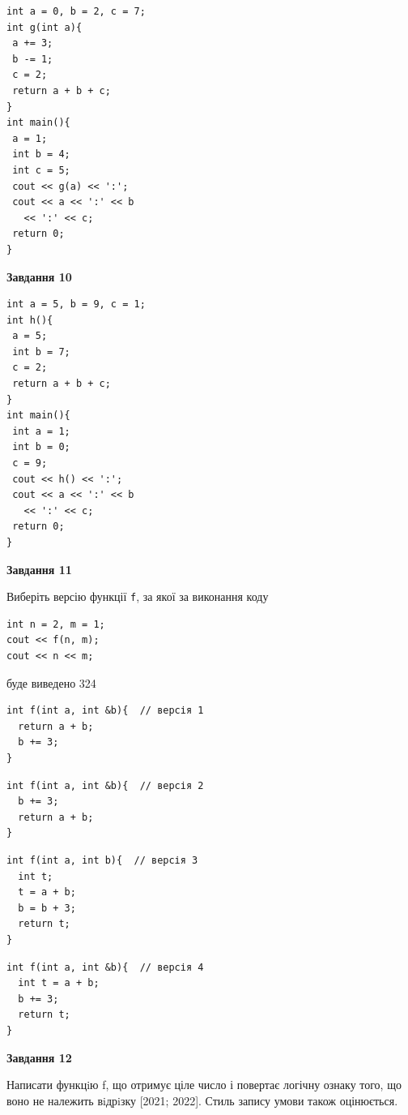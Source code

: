 \documentclass[12pt, ukrainian]{article}
\def\code#1{\Verb!#1!}
\begin{document}
{\begin {large}
\begin{minipage}[t]{7.0cm}
\begin{verbatim}
int a = 0, b = 2, c = 7;
int g(int a){
 a += 3;
 b -= 1;
 c = 2;
 return a + b + c;
}
int main(){
 a = 1;
 int b = 4;
 int c = 5;
 cout << g(a) << ':';
 cout << a << ':' << b 
   << ':' << c;
 return 0;
}
\end{verbatim}



\begin{center}
\textbf{Завдання 10}
\end{center}
\vspace{-8mm}

\begin{verbatim}
int a = 5, b = 9, c = 1;
int h(){
 a = 5;
 int b = 7;
 c = 2;
 return a + b + c;
}
int main(){
 int a = 1;
 int b = 0;
 c = 9;
 cout << h() << ':';
 cout << a << ':' << b 
   << ':' << c;
 return 0;
}
\end{verbatim}

\end{minipage}
\vline \hspace{1mm}
\begin{minipage}[t]{11.0cm}

\begin{center}
\textbf{Завдання 11}
\end{center}
Виберіть версію функції \code{f}, за якої за виконання коду
\begin{verbatim}
int n = 2, m = 1;
cout << f(n, m);
cout << n << m;
\end{verbatim}

буде виведено 324

\begin{verbatim}
int f(int a, int &b){  // версія 1
  return a + b;
  b += 3;
}
\end{verbatim}

\vspace{-8mm}\begin{verbatim}
int f(int a, int &b){  // версія 2
  b += 3;
  return a + b;
}
\end{verbatim}

\vspace{-8mm}\begin{verbatim}
int f(int a, int b){  // версія 3
  int t;
  t = a + b;
  b = b + 3;
  return t;
}
\end{verbatim}

\vspace{-8mm}\begin{verbatim}
int f(int a, int &b){  // версія 4
  int t = a + b;
  b += 3;
  return t;
}
\end{verbatim}



\begin{center}
\textbf{Завдання 12}
\end{center}

Написати функцiю f, що отримує ціле число і повертає логічну ознаку того, що воно не належить вiдрiзку [2021; 2022]. Стиль запису умови також оцінюється.\par

\end{minipage}

\end {large}}
\end{document}
